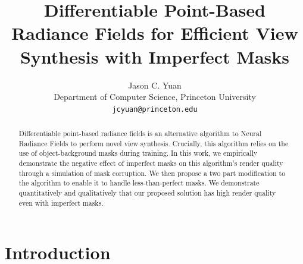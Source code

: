\documentclass[10pt,twocolumn,letterpaper]{article}
\begin{document}
\title{Differentiable Point-Based Radiance
Fields for Efficient View Synthesis with
Imperfect Masks}

\author{Jason C. Yuan\\
Department of Computer Science, Princeton University\\
{\tt\small jcyuan@princeton.edu}
}

\maketitle
\ificcvfinal\thispagestyle{empty}\fi

\begin{abstract} 
Differentiable point-based radiance fields is an alternative algorithm to Neural Radiance Fields to perform novel view synthesis. Crucially, this algorithm relies on the use of object-background masks during training. In this work, we empirically demonstrate the negative effect of imperfect masks on this algorithm's render quality through a simulation of mask corruption. We then propose a two part modification to the algorithm to enable it to handle less-than-perfect masks. We demonstrate quantitatively and qualitatively that our proposed solution has high render quality even with imperfect masks. 

\end{abstract}
\section{Introduction}

\let\thefootnote\relax{}

\end{document}
